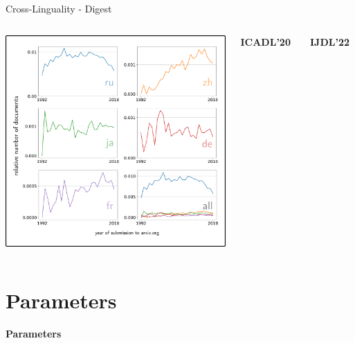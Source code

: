 \documentclass[en,16:9,smallfoot]{sdqbeamer}
\begin{document}
\begin{frame}{Cross-Linguality - Digest}
\begin{columns}
            \includegraphics[width=0.8\linewidth]{imgs/xling_example_result}
           \begin{infobox-pub-small}
           \textbf{ICADL'20}~\cite{Saier2020xling}
           \end{infobox-pub-small}
           \vspace{-0.5em}
           \begin{infobox-pub-small}
           \textbf{IJDL'22}~\cite{Saier2021}
           \end{infobox-pub-small}
   \end{columns}
   \end{frame}

\section{Parameters}

   \begin{frame}[plain]
        \vspace{0.7cm}
        \begin{infobox-map}
        \centering
        \begin{Huge}
        \textbf{Parameters}\\
        \end{Huge}
        \end{infobox-map}
   \end{frame}
\end{document}
